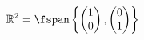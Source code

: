 \begin{exm}\label{exm-span-of-r2}
	\begin{equation*}
		\mathbb{R}^2=\fspan\left\{
		\begin{pmatrix}
			1 \\0
		\end{pmatrix},
		\begin{pmatrix}
			0 \\1
		\end{pmatrix}
		\right\}
	\end{equation*}
\end{exm}
